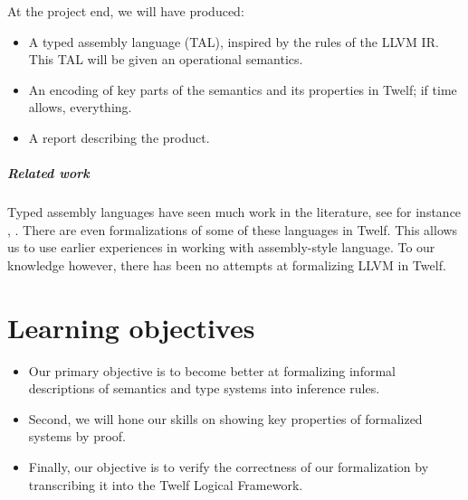 \documentclass[a4paper, oneside, 10pt, final]{memoir}
\begin{document}
At the project end, we will have produced:
\begin{itemize}
\item A typed assembly language (TAL), inspired by the rules of the LLVM
  IR. This TAL will be given an operational semantics.
\item An encoding of key parts of the semantics and its properties in
  Twelf; if time allows, everything.
\item A report describing the product.
\end{itemize}

\paragraph{Related work}

Typed assembly languages have seen much work in the literature, see
for instance \cite{crary:2003:toward},
\cite{morrisett.crary.ea:1999:talx86}. There are even formalizations
of some of these languages in Twelf. This allows us to use earlier
experiences in working with assembly-style language. To our knowledge
however, there has been no attempts at formalizing LLVM in Twelf.

\chapter*{Learning objectives}

\begin{itemize}
\item Our primary objective is to become better at formalizing informal
  descriptions of semantics and type systems into inference rules.
\item Second, we will hone our skills on showing key properties of
  formalized systems by proof.
\item Finally, our objective is to verify the correctness of our
  formalization by transcribing it into the Twelf Logical Framework.
\end{itemize}


\end{document}
